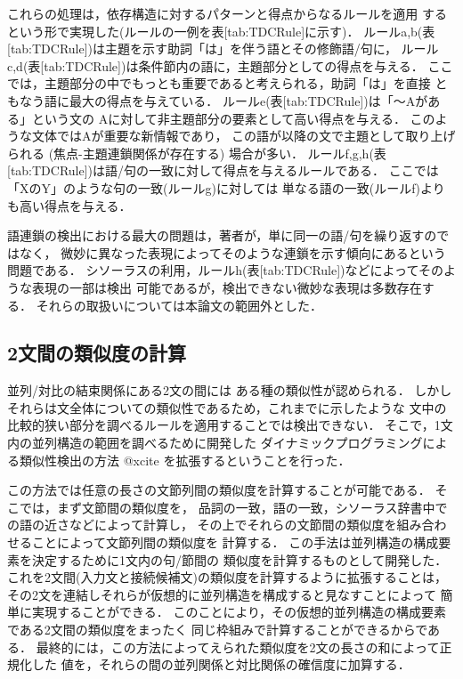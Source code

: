 これらの処理は，依存構造に対するパターンと得点からなるルールを適用
するという形で実現した(ルールの一例を表[tab:TDCRule]に示す)．
ルールa,b(表[tab:TDCRule])は主題を示す助詞「は」を伴う語とその修飾語/句に，
ルールc,d(表[tab:TDCRule])は条件節内の語に，主題部分としての得点を与える．
ここでは，主題部分の中でもっとも重要であると考えられる，助詞「は」を直接
ともなう語に最大の得点を与えている．
ルールe(表[tab:TDCRule])は「〜Aがある」という文の
Aに対して非主題部分の要素として高い得点を与える．
このような文体ではAが重要な新情報であり，
この語が以降の文で主題として取り上げられる
(焦点-主題連鎖関係が存在する) 場合が多い．
ルールf,g,h(表[tab:TDCRule])は語/句の一致に対して得点を与えるルールである．
ここでは「XのY」のような句の一致(ルールg)に対しては
単なる語の一致(ルールf)よりも高い得点を与える．

語連鎖の検出における最大の問題は，著者が，単に同一の語/句を繰り返すのではなく，
微妙に異なった表現によってそのような連鎖を示す傾向にあるという問題である．
シソーラスの利用，ルールh(表[tab:TDCRule])などによってそのような表現の一部は検出
可能であるが，検出できない微妙な表現は多数存在する．
それらの取扱いについては本論文の範囲外とした．

\subsection{2文間の類似度の計算}

並列/対比の結束関係にある2文の間には
ある種の類似性が認められる．
しかしそれらは文全体についての類似性であるため，これまでに示したような
文中の比較的狭い部分を調べるルールを適用することでは検出できない．
そこで，1文内の並列構造の範囲を調べるために開発した
ダイナミックプログラミングによる類似性検出の方法
@xcite
を拡張するということを行った．

この方法では任意の長さの文節列間の類似度を計算することが可能である．
そこでは，まず文節間の類似度を，
品詞の一致，語の一致，シソーラス辞書中での語の近さなどによって計算し，
その上でそれらの文節間の類似度を組み合わせることによって文節列間の類似度を
計算する．
この手法は並列構造の構成要素を決定するために1文内の句/節間の
類似度を計算するものとして開発した．
これを2文間(入力文と接続候補文)の類似度を計算するように拡張することは，
その2文を連結しそれらが仮想的に並列構造を構成すると見なすことによって
簡単に実現することができる．
このことにより，その仮想的並列構造の構成要素である2文間の類似度をまったく
同じ枠組みで計算することができるからである．
最終的には，この方法によってえられた類似度を2文の長さの和によって正規化した
値を，それらの間の並列関係と対比関係の確信度に加算する．


